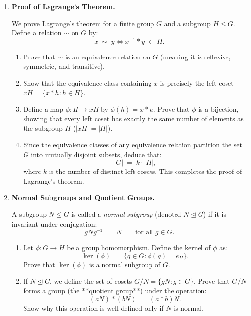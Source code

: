 \documentclass[12pt, a4paper]{article}
\newcommand{\newterm}[1]{\textit{\textcolor{DiscoveryColor}{#1}}}
\begin{document}
\begin{enumerate}[label=\textbf{D\arabic*.}]
  \item \textbf{Proof of Lagrange's Theorem.}
  
        We prove Lagrange's theorem for a finite group $G$ and a subgroup $H \le G$.
        Define a relation $\sim$ on $G$ by:
        \[
          x \;\sim\; y \iff x^{-1} * y \;\in\; H.
        \]
        \begin{enumerate}[label=(\alph*)]
          \item Prove that $\sim$ is an equivalence relation on $G$ (meaning it is reflexive, symmetric, and transitive).
          \item Show that the equivalence class containing $x$ is precisely the left coset $xH = \{x * h : h \in H\}$.
          \item Define a map $\phi: H \to xH$ by $\phi(h) = x * h$. Prove that $\phi$ is a bijection, showing that every left coset has exactly the same number of elements as the subgroup $H$ ($|xH| = |H|$).
          \item Since the equivalence classes of any equivalence relation partition the set $G$ into mutually disjoint subsets, deduce that:
          \[
            |G| \;=\; k \cdot |H|,
          \]
          where $k$ is the number of distinct left cosets. This completes the proof of Lagrange's theorem.
        \end{enumerate}

  \item \textbf{Normal Subgroups and Quotient Groups.}
  
        A subgroup $N \le G$ is called a \newterm{normal subgroup} (denoted $N \trianglelefteq G$) if it is invariant under conjugation:
        \[
          g N g^{-1} \;=\; N \qquad \text{for all } g \in G.
        \]
        \begin{enumerate}[label=(\alph*)]
          \item Let $\phi: G \to H$ be a group homomorphism. Define the kernel of $\phi$ as:
                \[
                  \ker(\phi) \;=\; \{g \in G : \phi(g) = e_H\}.
                \]
                Prove that $\ker(\phi)$ is a normal subgroup of $G$.
          \item If $N \trianglelefteq G$, we define the set of cosets $G/N = \{gN : g \in G\}$.
                Prove that $G/N$ forms a group (the **quotient group**) under the operation:
                \[
                  (aN) * (bN) \;=\; (a * b)N.
                \]
                Show why this operation is well-defined only if $N$ is normal.
        \end{enumerate}
\end{enumerate}
\end{document}

